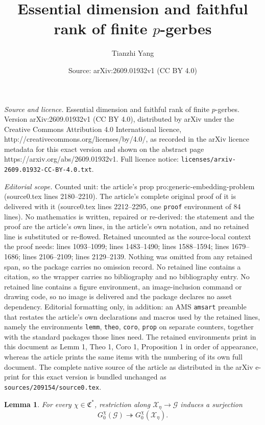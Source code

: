 \documentclass[10pt,a4paper]{amsart}
\title{Essential dimension and faithful rank of finite $p$-gerbes}
\author{Tianzhi Yang}
\date{Source: arXiv:2609.01932v1 (CC BY 4.0)}
\newtheorem{lemm}{Lemma}
\def\cG{{\mathcal G}}
\def\cX{{\mathcal X}}
\def\fC{{\mathfrak C}}
\begin{document}
\maketitle

\noindent\emph{Source and licence.} Essential dimension and faithful rank of finite $p$-gerbes. Version arXiv:2609.01932v1 (CC BY 4.0), distributed by arXiv under the Creative Commons Attribution 4.0 International licence, http://creativecommons.org/licenses/by/4.0/, as recorded in the arXiv licence metadata for this exact version and shown on the abstract page https://arxiv.org/abs/2609.01932v1. Full licence notice: \texttt{licenses/arxiv-2609.01932-CC-BY-4.0.txt}.\par\smallskip

\noindent\textit{Editorial scope.} Counted unit: the article's prop pro:generic-embedding-problem (source0.tex lines 2180--2210). The article's complete original proof of it is delivered with it (source0.tex lines 2212--2295, one \texttt{proof} environment of 84 lines). No mathematics is written, repaired or re-derived: the statement and the proof are the article's own lines, in the article's own notation, and no retained line is substituted or re-flowed.  Retained uncounted as the source-local context the proof needs: lines 1093--1099; lines 1483--1490; lines 1588--1594; lines 1679--1686; lines 2106--2109; lines 2129--2139.  Nothing was omitted from any retained span, so the package carries no omission record.  No retained line contains a citation, so the wrapper carries no bibliography and no bibliography entry.  No retained line contains a figure environment, an image-inclusion command or drawing code, so no image is delivered and the package declares no asset dependency.  Editorial formatting only, in addition: an AMS \texttt{amsart} preamble that restates the article's own declarations and macros used by the retained lines, namely the environments \texttt{lemm}, \texttt{theo}, \texttt{coro}, \texttt{prop} on separate counters, together with the standard packages those lines need.  The retained environments print in this document as Lemm 1, Theo 1, Coro 1, Proposition 1 in order of appearance, whereas the article prints the same items with the numbering of its own full document.  The complete native source of the article as distributed in the arXiv e-print for this exact version is bundled unchanged as \texttt{sources/209154/source0.tex}.
\begin{lemm}\label{lem:generic-central-g0-surjection}
For every $\chi\in\fC^*$, restriction along $\cX_\eta\to\cG$ induces a
surjection
\[
G_0^\chi(\cG)\twoheadrightarrow G_0^\chi(\cX_\eta).
\]
\end{lemm}
\end{document}
